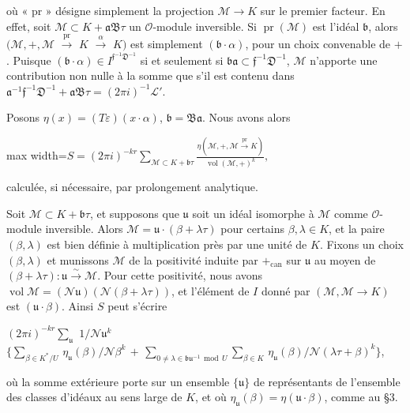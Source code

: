 \documentclass[11pt]{article}
\newcommand{\DFormula}[1]{\par\smallskip\noindent\begin{adjustbox}{max width=\linewidth}$\displaystyle #1$\end{adjustbox}\par\smallskip}
\begin{document}
où « pr » désigne simplement la projection \(\mathcal{M}\to K\) sur le premier facteur. En effet, soit \(\mathcal{M}\subset K+𝔞𝔅\tau \) un \(\mathcal{O}\)-module inversible. Si \(\operatorname{pr}(\mathcal{M})\) est l’idéal \(𝔟\), alors \((\mathcal{M},+,\mathcal{M}\) \(\xrightarrow{\operatorname{pr}}\) \(K\) \(\xrightarrow{\alpha }\) \(\widehat{K})\) est simplement \((𝔟\cdot \alpha )\), pour un choix convenable de \(+\). Puisque \((𝔟\cdot \alpha )\in I^{𝔣^{-1}𝔇^{-1}}\) si et seulement si \(𝔟𝔞\subset 𝔣^{-1}𝔇^{-1}\), \(\mathcal{M}\) n’apporte une contribution non nulle à la somme que s’il est contenu dans \(𝔞^{-1}𝔣^{-1}𝔇^{-1}+𝔞𝔅\tau =(2\pi i)^{-1}\mathcal{L}'\).\par
\par
Posons \(\eta (x)=(T\varepsilon )(x\cdot \alpha )\), \(𝔟=𝔅𝔞\). Nous avons alors\par
\par
\DFormula{S=(2\pi i)^{-kr}\sum_{\mathcal M\subset K+\mathfrak b\tau}\frac{\eta(\mathcal M,+,\mathcal M\xrightarrow{\mathrm{pr}}K)}{\operatorname{vol}(\mathcal M,+)^k},}
\par
calculée, si nécessaire, par prolongement analytique.\par
\par
Soit \(\mathcal{M}\subset K+𝔟\tau \), et supposons que \(𝔲\) soit un idéal isomorphe à \(\mathcal{M}\) comme \(\mathcal{O}\)-module inversible. Alors \(\mathcal{M}=𝔲\cdot (\beta +\lambda \tau )\) pour certains \(\beta ,\lambda \in K\), et la paire \((\beta ,\lambda )\) est bien définie à multiplication près par une unité de \(K\). Fixons un choix \((\beta ,\lambda )\) et munissons \(\mathcal{M}\) de la positivité induite par \(+_{\mathrm{can}}\) sur \(𝔲\) au moyen de \((\beta +\lambda \tau ):𝔲\xrightarrow{\sim}\mathcal{M}\). Pour cette positivité, nous avons \(\operatorname{vol}\mathcal{M}=(\mathcal{N}𝔲)(\mathcal{N}(\beta +\lambda \tau ))\), et l’élément de \(I\) donné par \((\mathcal{M},\mathcal{M}\to K)\) est \((𝔲\cdot \beta )\). Ainsi \(S\) peut s’écrire\par
\par
\((2\pi i)^{-kr}\sum _{𝔲}\) \(1/\mathcal{N}𝔲^{k}\) \(\lbrace \sum _{\beta \in K^{\ast}/U}\,\eta _{𝔲}(\beta )/\mathcal{N}\beta ^{k}\,+\,\sum _{0\neq \lambda \in 𝔟𝔲^{-1}\,\operatorname{mod}\,U}\sum _{\beta \in K}\,\eta _{𝔲}(\beta )/\mathcal{N}(\lambda \tau +\beta )^{k}\rbrace \),\par
\par
où la somme extérieure porte sur un ensemble \(\lbrace 𝔲\rbrace \) de représentants de l’ensemble des classes d’idéaux au sens large de \(K\), et où \(\eta _{𝔲}(\beta )=\eta (𝔲\cdot \beta )\), comme au §3.\par
\end{document}
